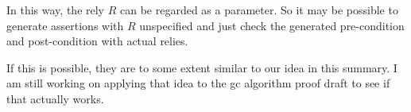 \documentclass[fleqn]{article}
\begin{document}
In this way, the rely $R$ can be regarded as a parameter. So it may be
possible to generate assertions with $R$ unspecified and just check
the generated pre-condition and post-condition with actual relies.

If this is possible, they are to some extent similar to our idea in
this summary. I am still working on applying that idea to the gc
algorithm proof draft to see if that actually works.

\end{document}
